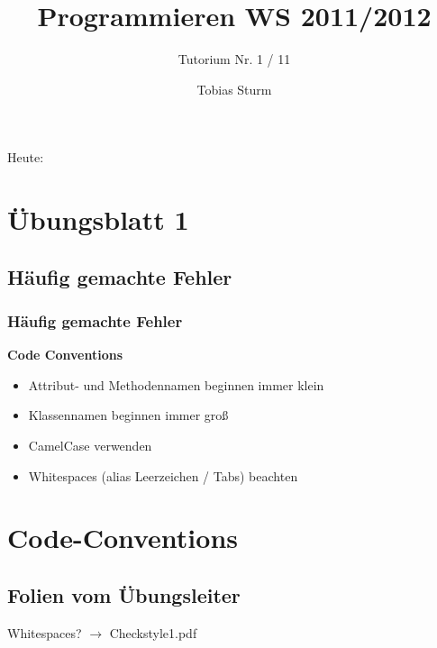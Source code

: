 \documentclass[18pt]{beamer}
\title[Proggen WS11/12]{Programmieren WS 2011/2012}
\subtitle{Tutorium Nr. 1 / 11}
\author{Tobias Sturm} %
\institute{Zertifizierbare Vertrauenswürdige Informatiksysteme}
\date[23.1.12] %
\begin{document}


\begin{frame}
	\titlepage
\end{frame}


\begin{frame}{Heute:}
	\tableofcontents
\end{frame}


\section{Übungsblatt 1}
\subsection{Häufig gemachte Fehler}
\begin{frame}
	\frametitle{Häufig gemachte Fehler}
	\textbf{Code Conventions} \pause
		\begin{itemize}
			\item Attribut- und Methodennamen beginnen immer klein
			\item Klassennamen beginnen immer groß
			\item CamelCase verwenden
			\item Whitespaces (alias Leerzeichen / Tabs) beachten
		\end{itemize}
\end{frame}


\section{Code-Conventions}
\subsection{Folien vom Übungsleiter}
\begin{frame}{Whitespaces?}
	$\rightarrow$ Checkstyle1.pdf
\end{frame}

\end{document}
